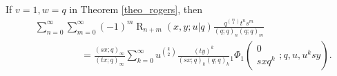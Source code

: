 \documentclass{cimart}
\DeclareMathOperator{\opR}{R}
\begin{document}
\begin{corollary}\label{coro10}
If $v=1,w=q$ in Theorem \ref{theo_rogers}, then
\begin{align}
    &\sum_{n=0}^{\infty}\sum_{m=0}^{\infty}(-1)^m\opR_{n+m}(x,y;u|q)\frac{q^{\binom{m}{2}}t^{n}s^{m}}{(q;q)_{n}(q;q)_{m}}\nonumber\\
        &\hspace{2cm}=\frac{(sx;q)_{\infty}}{(tx;q)_{\infty}}\sum_{k=0}^{\infty}u^{\binom{k}{2}}\frac{(ty)^k}{(sx;q)_{k}(q;q)_{k}}{}_{1}\Phi_{1}\left(
        \begin{array}{c}
             0 \\
             sxq^k
        \end{array};
        q,u,u^ksy
        \right).
\end{align}
\end{corollary}
\end{document}
